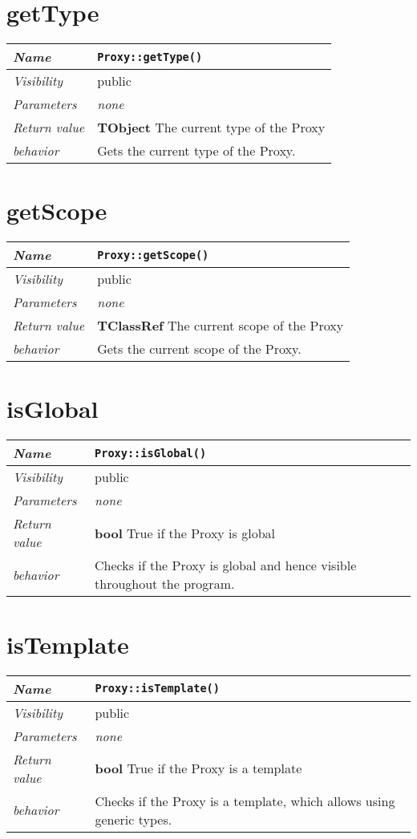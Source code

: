  \section{getType}
\begin{longtable}{p{3cm} @{\hskip 1cm} p{12cm}}
 \hline
\textit{Name} & \texttt{Proxy::getType()}\\
\hline
 \textit{Visibility} & public\\
\hline
\textit{Parameters} & \textit{none}\\
\hline
\textit{Return value} & \textbf{ TObject} The current type of the Proxy \\
  \hline
 \textit{behavior} & Gets the current type of the Proxy. \\
\hline
\end{longtable} \pagebreak
 \section{getScope}
\begin{longtable}{p{3cm} @{\hskip 1cm} p{12cm}}
 \hline
\textit{Name} & \texttt{Proxy::getScope()}\\
\hline
 \textit{Visibility} & public\\
\hline
\textit{Parameters} & \textit{none}\\
\hline
\textit{Return value} & \textbf{ TClassRef} The current scope of the Proxy \\
  \hline
 \textit{behavior} & Gets the current scope of the Proxy. \\
\hline
\end{longtable} \pagebreak
 \section{isGlobal}
\begin{longtable}{p{3cm} @{\hskip 1cm} p{12cm}}
 \hline
\textit{Name} & \texttt{Proxy::isGlobal()}\\
\hline
 \textit{Visibility} & public\\
\hline
\textit{Parameters} & \textit{none}\\
\hline
\textit{Return value} & \textbf{ bool} True if the Proxy is global \\
  \hline
 \textit{behavior} & Checks if the Proxy is global and hence visible throughout the program. \\
\hline
\end{longtable} \pagebreak
 \section{isTemplate}
\begin{longtable}{p{3cm} @{\hskip 1cm} p{12cm}}
 \hline
\textit{Name} & \texttt{Proxy::isTemplate()}\\
\hline
 \textit{Visibility} & public\\
\hline
\textit{Parameters} & \textit{none}\\
\hline
\textit{Return value} & \textbf{ bool} True if the Proxy is a template \\
  \hline
 \textit{behavior} & Checks if the Proxy is a template, which allows using generic types. \\
\hline
\end{longtable} \pagebreak
